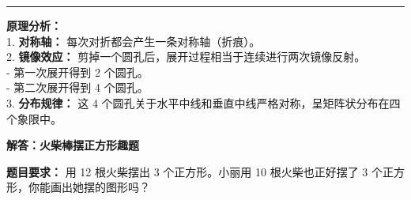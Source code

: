 \documentclass[12pt, a4paper]{ctexart}
\begin{document}
\vspace{1.0cm}
\hrule
\vspace{0.4cm}

{\small
\textbf{原理分析：} \\
1. \textbf{对称轴：} 每次对折都会产生一条对称轴（折痕）。 \\
2. \textbf{镜像效应：} 剪掉一个圆孔后，展开过程相当于连续进行两次镜像反射。 \\
   - 第一次展开得到 2 个圆孔。 \\
   - 第二次展开得到 4 个圆孔。 \\
3. \textbf{分布规律：} 这 4 个圆孔关于水平中线和垂直中线严格对称，呈矩阵状分布在四个象限中。
}


\newpage

\begin{center}
  {\large\bfseries 解答：火柴棒摆正方形趣题}
\end{center}

\vspace{0.6cm}

\noindent
{\small \textbf{题目要求：} 用 12 根火柴摆出 3 个正方形。小丽用 10 根火柴也正好摆了 3 个正方形，你能画出她摆的图形吗？}

\vspace{1.0cm}
\end{document}
